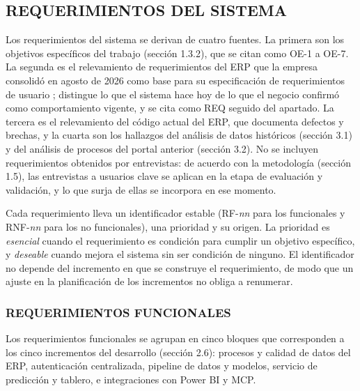 \subsection{REQUERIMIENTOS DEL SISTEMA}

Los requerimientos del sistema se derivan de cuatro fuentes. La primera son los objetivos específicos del trabajo (sección 1.3.2), que se citan como OE-1 a OE-7. La segunda es el relevamiento de requerimientos del ERP que la empresa consolidó en agosto de 2026 como base para su especificación de requerimientos de usuario \parencite{ISIMustang2026Requerimientos}; distingue lo que el sistema hace hoy de lo que el negocio confirmó como comportamiento vigente, y se cita como REQ seguido del apartado. La tercera es el relevamiento del código actual del ERP, que documenta defectos y brechas, y la cuarta son los hallazgos del análisis de datos históricos (sección 3.1) y del análisis de procesos del portal anterior (sección 3.2). No se incluyen requerimientos obtenidos por entrevistas: de acuerdo con la metodología (sección 1.5), las entrevistas a usuarios clave se aplican en la etapa de evaluación y validación, y lo que surja de ellas se incorpora en ese momento.

Cada requerimiento lleva un identificador estable (RF-\textit{nn} para los funcionales y RNF-\textit{nn} para los no funcionales), una prioridad y su origen. La prioridad es \emph{esencial} cuando el requerimiento es condición para cumplir un objetivo específico, y \emph{deseable} cuando mejora el sistema sin ser condición de ninguno. El identificador no depende del incremento en que se construye el requerimiento, de modo que un ajuste en la planificación de los incrementos no obliga a renumerar.

\subsubsection{REQUERIMIENTOS FUNCIONALES}

Los requerimientos funcionales se agrupan en cinco bloques que corresponden a los cinco incrementos del desarrollo (sección 2.6): procesos y calidad de datos del ERP, autenticación centralizada, pipeline de datos y modelos, servicio de predicción y tablero, e integraciones con Power BI y MCP\@.

